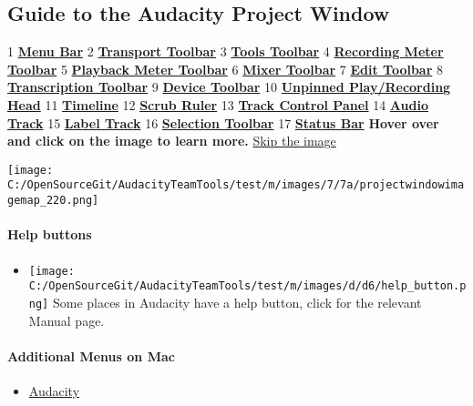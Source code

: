 \begin{multicols}{2}
\subsection{Guide to the Audacity Project Window}1\textbf{
\hyperref[\foo{man_menu_reference_}]{Menu Bar}
}2\textbf{
\hyperref[\foo{man_transport_toolbar_}]{Transport Toolbar}
}3\textbf{
\hyperref[\foo{man_tools_toolbar_}]{Tools Toolbar}
}4\textbf{
\hyperref[\foo{man_meter_toolbar_recording}]{Recording Meter Toolbar}
}5\textbf{
\hyperref[\foo{man_meter_toolbar_playback}]{Playback Meter Toolbar}
}6\textbf{
\hyperref[\foo{man_mixer_toolbar_}]{Mixer Toolbar}
}7\textbf{
\hyperref[\foo{man_edit_toolbar_}]{Edit Toolbar}
}8\textbf{
\hyperref[\foo{man_transcription_toolbar_}]{Transcription Toolbar}
}9\textbf{
\hyperref[\foo{man_device_toolbar_}]{Device Toolbar}
}10\textbf{
\hyperref[\foo{man_timeline_pinned}]{Unpinned Play/Recording Head}
}11\textbf{
\hyperref[\foo{man_timeline_}]{Timeline}
}12\textbf{
\hyperref[\foo{man_scrubbing_and_seeking_scrubbing}]{Scrub Ruler}
}13\textbf{
\hyperref[\foo{man_track_control_panel_and_vertical_scale_}]{Track Control Panel}
}14\textbf{
\hyperref[\foo{man_audio_tracks_}]{Audio Track}
}15\textbf{
\hyperref[\foo{man_label_tracks_}]{Label Track}
}16\textbf{
\hyperref[\foo{man_selection_toolbar_}]{Selection Toolbar}
}17\textbf{
\hyperref[\foo{man_status_bar_}]{Status Bar}
}\textbf{Hover over and click on the image to learn more.}
\hyperref[\foo{index__skiptheimage}]{Skip the image}
\par \protect\texttt{[image: C:/OpenSourceGit/AudacityTeamTools/test/m/images/7/7a/projectwindowimagemap\_220.png]}\par 
\paragraph{Help buttons}
\begin{itemize}
\item \protect\texttt{[image: C:/OpenSourceGit/AudacityTeamTools/test/m/images/d/d6/help\_button.png]} Some places in Audacity have a help button, click for the relevant Manual page.
\end{itemize}

\paragraph{Additional Menus on Mac}
\begin{itemize}
\item 
\hyperref[\foo{man_audacity_menu_}]{Audacity}


\end{itemize}
\end{multicols}
